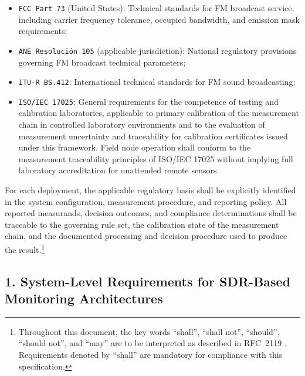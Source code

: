 \documentclass[11pt]{report}
\begin{document}
\begin{description}
	\begin{itemize}
		\item \texttt{FCC Part 73} (United States): Technical standards for FM broadcast service, including carrier frequency tolerance, occupied bandwidth, and emission mask requirements;
		\item \texttt{ANE Resolución 105} (applicable jurisdiction): National regulatory provisions governing FM broadcast technical parameters;
		\item \texttt{ITU-R BS.412}: International technical standards for FM sound broadcasting;
		\item \texttt{ISO/IEC 17025}: General requirements for the competence of testing and calibration laboratories, applicable to primary calibration of the measurement chain in controlled laboratory environments and to the evaluation of measurement uncertainty and traceability for calibration certificates issued under this framework. Field node operation shall conform to the measurement traceability principles of ISO/IEC 17025 without implying full laboratory accreditation for unattended remote sensors.
	\end{itemize}
	
	For each deployment, the applicable regulatory basis shall be explicitly identified in the system configuration, measurement procedure, and reporting policy. All reported measurands, decision outcomes, and compliance determinations shall be traceable to the governing rule set, the calibration state of the measurement chain, and the documented processing and decision procedure used to produce the result.\footnote[01]{Throughout this document, the key words ``shall'', ``shall not'', ``should'', ``should not'', and ``may'' are to be interpreted as described in RFC~2119 \cite{rfc2119}. Requirements denoted by ``shall'' are mandatory for compliance with this specification.}
\end{description}
\newpage

\subsection*{1. System-Level Requirements for SDR-Based Monitoring Architectures}
\end{document}
